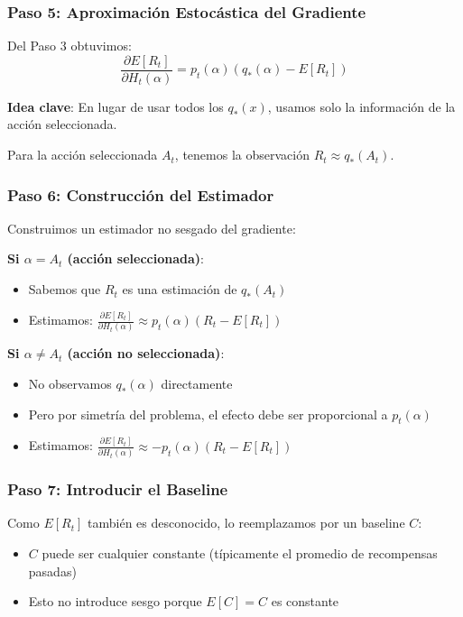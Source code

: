 \documentclass[12pt,a4paper]{article}
\begin{document}
\subsubsection{Paso 5: Aproximación Estocástica del Gradiente}

Del Paso 3 obtuvimos:
$$\frac{\partial E[R_t]}{\partial H_t(\alpha)} = p_t(\alpha)(q_*(\alpha) - E[R_t])$$

\textbf{Idea clave}: En lugar de usar todos los $q_*(x)$, usamos solo la información de la acción seleccionada.

Para la acción seleccionada $A_t$, tenemos la observación $R_t \approx q_*(A_t)$.

\subsubsection{Paso 6: Construcción del Estimador}

Construimos un estimador no sesgado del gradiente:

\textbf{Si $\alpha = A_t$ (acción seleccionada)}:
\begin{itemize}
    \item Sabemos que $R_t$ es una estimación de $q_*(A_t)$
    \item Estimamos: $\frac{\partial E[R_t]}{\partial H_t(\alpha)} \approx p_t(\alpha)(R_t - E[R_t])$
\end{itemize}

\textbf{Si $\alpha \neq A_t$ (acción no seleccionada)}:
\begin{itemize}
    \item No observamos $q_*(\alpha)$ directamente
    \item Pero por simetría del problema, el efecto debe ser proporcional a $p_t(\alpha)$
    \item Estimamos: $\frac{\partial E[R_t]}{\partial H_t(\alpha)} \approx -p_t(\alpha)(R_t - E[R_t])$
\end{itemize}

\subsubsection{Paso 7: Introducir el Baseline}

Como $E[R_t]$ también es desconocido, lo reemplazamos por un baseline $C$:
\begin{itemize}
    \item $C$ puede ser cualquier constante (típicamente el promedio de recompensas pasadas)
    \item Esto no introduce sesgo porque $E[C] = C$ es constante
\end{itemize}
\end{document}
